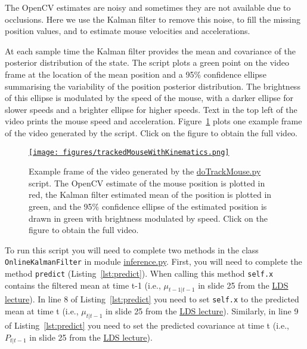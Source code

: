 \documentclass[12pt]{article}
\begin{document}
The OpenCV estimates are noisy and sometimes they are not available due to occlusions.
Here we use the Kalman filter to remove this noise, to fill the
missing position values, and to estimate mouse velocities and accelerations.

At each sample time the Kalman filter provides the mean and covariance of the
posterior distribution of the state. The script plots a green point on the
video frame at the location of the mean position and a 95\% confidence ellipse
summarising the variability of the position posterior distribution. The
brightness of this ellipse is modulated by the speed of the mouse, with a
darker ellipse for slower speeds and a brighter ellipse for higher speeds. Text
in the top left of the video prints the mouse speed and acceleration.
Figure~\ref{fig:trackedMouseWithKinematics} plots one example frame of the
video generated by the script. Click on the figure to obtain the full video.

\begin{figure}
	\begin{center}
		\href{https://www.gatsby.ucl.ac.uk/~rapela/neuroinformatics/2024/worksheets/linearDynamicalSystems/videos/FrameTop_2021-06-03T17-00-00_end001000.avi}{\texttt{[image: figures/trackedMouseWithKinematics.png]}}
		\label{fig:trackedMouseWithKinematics}

        \caption{Example frame of the video generated by the
        \href{https://github.com/joacorapela/neuroinformatics24/blob/master/worksheets/07_linearDynamicalSystems/code/scripts/doTrackMouse.py}{doTrackMouse.py}
        script. The OpenCV estimate of the mouse position is plotted in red,
        the Kalman filter estimated mean of the position is plotted in green,
        and the 95\% confidence ellipse of the estimated position is drawn in
        green with brightness modulated by speed. Click on the figure to obtain
        the full video.}

	\end{center}
\end{figure}

To run this script you will need to complete two methods in the class
\texttt{OnlineKalmanFilter} in module
\href{https://github.com/joacorapela/neuroinformatics24/blob/master/worksheets/07_linearDynamicalSystems/code/src/inference.py}{inference.py}.
%
First, you will need to complete the method \texttt{predict}
(Listing~\ref{lst:predict}). When calling this method \texttt{self.x} contains
the filtered mean at time t-1 (i.e., $\mu_{t-1|t-1}$ in slide 25 from the
\href{https://github.com/joacorapela/neuroinformatics24/blob/master/lectures/07_linearDynamicalSystems/LDS_SWCNeuroinf2024.pdf}{LDS
lecture}). In line 8 of Listing~\ref{lst:predict} you need to set
\texttt{self.x} to the predicted mean at time t (i.e., $\mu_{t|t-1}$ in slide
25 from the
\href{https://github.com/joacorapela/neuroinformatics24/blob/master/lectures/07_linearDynamicalSystems/LDS_SWCNeuroinf2024.pdf}{LDS
lecture}). Similarly, in line 9 of Listing~\ref{lst:predict} you need to set
the predicted covariance at time t (i.e., $P_{t|t-1}$ in slide 25 from the
\href{https://github.com/joacorapela/neuroinformatics24/blob/master/lectures/07_linearDynamicalSystems/LDS_SWCNeuroinf2024.pdf}{LDS lecture}). 
\end{document}
